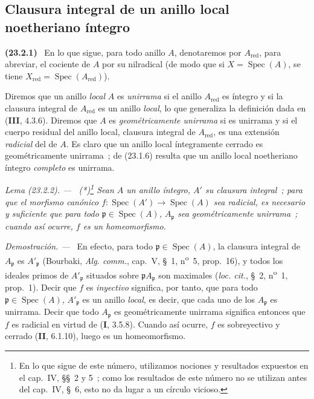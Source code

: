 \documentclass[10pt,oneside]{book}
\makeatletter
\newcommand{\setmanualcurrentlabel}[1]{\def\@currentlabel{#1}}
\newenvironment{env}[1][]{\setmanualcurrentlabel{#1}\par\medskip\noindent\textbf{(#1)}\ }{\par}
\newenvironment{lemma}[1][]{%
  \setmanualcurrentlabel{#1}\par\medskip\noindent\itshape Lema (#1). ---\ }{\par}
\newenvironment{proof}{%
  \par\medskip\noindent\textit{Demostración. ---\ }}{\par}
\makeatother
\begin{document}
\subsection{Clausura integral de un anillo local noetheriano íntegro}
\label{subsection:0.23.2-es}

\begin{env}[23.2.1]
\label{0.23.2.1-es}
En lo que sigue, para todo anillo $A$, denotaremos por $A_{\mathrm{red}}$, para
abreviar, el cociente de $A$ por su nilradical (de modo que si
$X=\operatorname{Spec}(A)$, se tiene
$X_{\mathrm{red}}=\operatorname{Spec}(A_{\mathrm{red}})$).

Diremos que un anillo \emph{local} $A$ es \emph{unirrama} si el anillo
$A_{\mathrm{red}}$ es íntegro y si la clausura integral de
$A_{\mathrm{red}}$ es un anillo \emph{local}, lo que generaliza la definición
dada en (\textbf{III}, 4.3.6). Diremos que $A$ es \emph{geométricamente
unirrama} si es unirrama y si el cuerpo residual del anillo local,
clausura integral de $A_{\mathrm{red}}$, es una extensión \emph{radicial}
del de $A$. Es claro que un anillo local íntegramente cerrado es
geométricamente unirrama~; de (23.1.6) resulta que un anillo local
noetheriano íntegro \emph{completo} es unirrama.
\end{env}

\begin{lemma}[23.2.2]
\label{0.23.2.2-es}
\textnormal{(*)}\footnote{En lo que sigue de este número, utilizamos
nociones y resultados expuestos en el cap.~IV, §§~2 y 5~; como los resultados de
este número no se utilizan antes del cap.~IV, §~6, esto no da lugar a un
círculo vicioso.} Sean $A$ un anillo íntegro, $A'$ su clausura integral~; para
que el morfismo canónico
$f:\operatorname{Spec}(A')\to\operatorname{Spec}(A)$ sea radicial, es necesario y
suficiente que para todo $\mathfrak p\in\operatorname{Spec}(A)$,
$A_{\mathfrak p}$ sea geométricamente unirrama~; cuando así ocurre,
$f$ es un homeomorfismo.
\end{lemma}

\begin{proof}
En efecto, para todo $\mathfrak p\in\operatorname{Spec}(A)$, la clausura
integral de $A_{\mathfrak p}$ es $A'_{\mathfrak p}$ (Bourbaki,
\emph{Alg. comm.}, cap.~V, §~1, n\textsuperscript{o}~5, prop.~16), y todos
los ideales primos de $A'_{\mathfrak p}$ situados sobre
$\mathfrak pA_{\mathfrak p}$ son maximales (\emph{loc. cit.}, §~2,
n\textsuperscript{o}~1, prop.~1). Decir que $f$ es \emph{inyectivo} significa, por tanto, que
para todo $\mathfrak p\in\operatorname{Spec}(A)$, $A'_{\mathfrak p}$ es un
anillo \emph{local}, es decir, que cada uno de los $A_{\mathfrak p}$ es
unirrama. Decir que todo $A_{\mathfrak p}$ es geométricamente unirrama
significa entonces que $f$ es radicial en virtud de (\textbf I, 3.5.8). Cuando así
ocurre, $f$ es sobreyectivo y cerrado (\textbf{II}, 6.1.10), luego es un homeomorfismo.
\end{proof}
\end{document}
